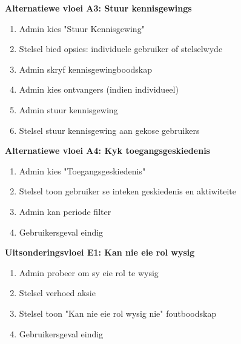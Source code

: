 \textbf{Alternatiewe vloei A3: Stuur kennisgewings}
\begin{enumerate}
    \item[7c.] Admin kies "Stuur Kennisgewing"
    \item Stelsel bied opsies: individuele gebruiker of stelselwyde
    \item Admin skryf kennisgewingboodskap
    \item Admin kies ontvangers (indien individueel)
    \item Admin stuur kennisgewing
    \item Stelsel stuur kennisgewing aan gekose gebruikers
\end{enumerate}

\textbf{Alternatiewe vloei A4: Kyk toegangsgeskiedenis}
\begin{enumerate}
    \item[7d.] Admin kies "Toegangsgeskiedenis"
    \item Stelsel toon gebruiker se inteken geskiedenis en aktiwiteite
    \item Admin kan periode filter
    \item Gebruikersgeval eindig
\end{enumerate}

\textbf{Uitsonderingsvloei E1: Kan nie eie rol wysig}
\begin{enumerate}
    \item[A1.3.] Admin probeer om sy eie rol te wysig
    \item Stelsel verhoed aksie
    \item Stelsel toon "Kan nie eie rol wysig nie" foutboodskap
    \item Gebruikersgeval eindig
\end{enumerate}
